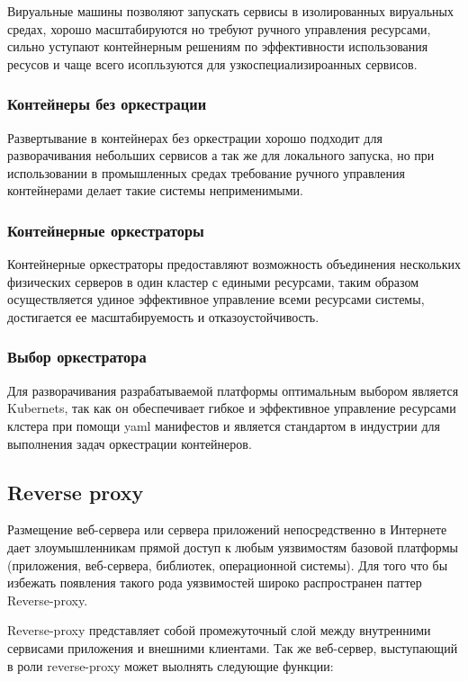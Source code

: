 Вируальные машины позволяют запускать сервисы в изолированных вируальных средах, хорошо масштабируются но требуют ручного управления ресурсами, сильно уступают контейнерным решениям по эффективности использования ресусов и чаще всего исопльзуются для узкоспециализироанных сервисов.

\subsubsection{Контейнеры без оркестрации}

Развертывание в контейнерах без оркестрации хорошо подходит для разворачивания небольших сервисов а так же для локального запуска, но при использовании в промышленных средах требование ручного управления контейнерами делает такие системы неприменимыми.

\subsubsection{Контейнерные оркестраторы}

Контейнерные оркестраторы предоставляют возможность объединения нескольких физических серверов в один кластер с едиными ресурсами, таким образом осуществляется удиное эффективное управление всеми ресурсами системы, достигается ее масштабируемость и отказоустойчивость. 

\subsubsection{Выбор оркестратора}

Для разворачивания разрабатываемой платформы оптимальным выбором является Kubernets, так как он обеспечивает гибкое и эффективное управление ресурсами клстера при помощи yaml манифестов и является стандартом в индустрии для выполнения задач оркестрации контейнеров.

\subsection{Reverse proxy}

Размещение веб-сервера или сервера приложений непосредственно в Интернете дает злоумышленникам прямой доступ к любым уязвимостям базовой платформы (приложения, веб-сервера, библиотек, операционной системы). Для того что бы избежать появления такого рода уязвимостей широко распространен паттер Reverse-proxy\cite{sommerlad2003reverse}.

Reverse-proxy представляет собой промежуточный слой между внутренними сервисами приложения и внешними клиентами.
Так же веб-сервер, выступающий в роли reverse-proxy может выолнять следующие функции:

